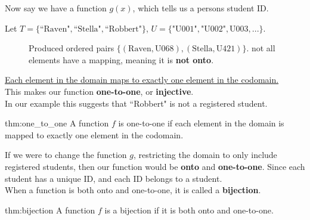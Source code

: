 \noindent
Now say we have a function $g(x)$, which tells us a persons student ID.\\
\begin{center}
    Let $T=\{\text{``Raven"}, \text{``Stella"}, \text{``Robbert"}\}$, $U=\{\text{"U001"}, \text{"U002"}, \text{U003}, ...\}$.
\end{center}

\begin{figure}[ht]
    \centering
    \caption{\centering Produced ordered pairs $\{(\text{Raven},\text{U068}),(\text{Stella},\text{U421})\}$.
        not all elements have a mapping, meaning it is \textbf{not onto}.}
    \label{fig:cats_dogs}
\end{figure}

\noindent
\underline{Each element in the domain maps to exactly one element in the codomain.}\\
This makes our function \textbf{one-to-one}, or \textbf{injective}.\\

\noindent
In our example this suggests that ``Robbert" is not a registered student.\\

\begin{Def}{thm:one_to_one}
    A function $f$ is one-to-one if each element in the domain is mapped to exactly one element in the codomain.
\end{Def}

\noindent
If we were to change the function $g$, restricting the domain to only include
registered students, then our function would be \textbf{onto} and \textbf{one-to-one}. Since
each student has a unique ID, and each ID belongs to a student.\\

\noindent
When a function is both onto and one-to-one, it is called a \textbf{bijection}.\\

\begin{Def}[Bijection]{thm:bijection}
    A function $f$ is a bijection if it is both onto and one-to-one.
\end{Def}

\newpage
